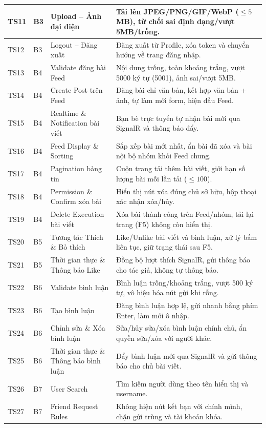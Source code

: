 \documentclass[11pt,a4paper]{article}
\begin{document}
\begin{longtable}{|C{1.3cm}|C{1.2cm}|L{4.8cm}|L{8.5cm}|}
TS11 & B3 & Upload -- Ảnh đại diện & Tải lên JPEG/PNG/GIF/WebP ($\le 5$MB), từ chối sai định dạng/vượt 5MB/trống. \\ \hline
TS12 & B3 & Logout -- Đăng xuất & Đăng xuất từ Profile, xóa token và chuyển hướng về trang đăng nhập. \\ \hline
TS13 & B4 & Validate đăng bài Feed & Nội dung trống, toàn khoảng trắng, vượt 5000 ký tự (5001), ảnh sai/vượt 5MB. \\ \hline
TS14 & B4 & Create Post trên Feed & Đăng bài chỉ văn bản, kết hợp văn bản + ảnh, tự làm mới form, hiện đầu Feed. \\ \hline
TS15 & B4 & Realtime \& Notification bài viết & Bạn bè trực tuyến tự nhận bài mới qua SignalR và thông báo đẩy. \\ \hline
TS16 & B4 & Feed Display \& Sorting & Sắp xếp bài mới nhất, ẩn bài đã xóa và bài nội bộ nhóm khỏi Feed chung. \\ \hline
TS17 & B4 & Pagination bảng tin & Cuộn trang tải thêm bài viết, giới hạn số lượng bài mỗi lần tải ($\le 100$). \\ \hline
TS18 & B4 & Permission \& Confirm xóa bài & Hiển thị nút xóa đúng chủ sở hữu, hộp thoại xác nhận xóa/hủy. \\ \hline
TS19 & B4 & Delete Execution bài viết & Xóa bài thành công trên Feed/nhóm, tải lại trang (F5) không còn hiển thị. \\ \hline
TS20 & B5 & Tương tác Thích \& Bỏ thích & Like/Unlike bài viết và bình luận, xử lý bấm liên tục, giữ trạng thái sau F5. \\ \hline
TS21 & B5 & Thời gian thực \& Thông báo Like & Đồng bộ lượt thích SignalR, gửi thông báo cho tác giả, không tự thông báo. \\ \hline
TS22 & B6 & Validate bình luận & Bình luận trống/khoảng trắng, vượt 500 ký tự, vô hiệu hóa nút gửi khi rỗng. \\ \hline
TS23 & B6 & Tạo bình luận & Đăng bình luận hợp lệ, gửi nhanh bằng phím Enter, làm mới ô nhập. \\ \hline
TS24 & B6 & Chỉnh sửa \& Xóa bình luận & Sửa/hủy sửa/xóa bình luận chính chủ, ẩn quyền sửa/xóa với người khác. \\ \hline
TS25 & B6 & Thời gian thực \& Thông báo bình luận & Đẩy bình luận mới qua SignalR và gửi thông báo cho chủ bài viết. \\ \hline
TS26 & B7 & User Search & Tìm kiếm người dùng theo tên hiển thị và username. \\ \hline
TS27 & B7 & Friend Request Rules & Không hiện nút kết bạn với chính mình, chặn gửi trùng và tài khoản khóa. \\ \hline

\end{longtable}
\end{document}
